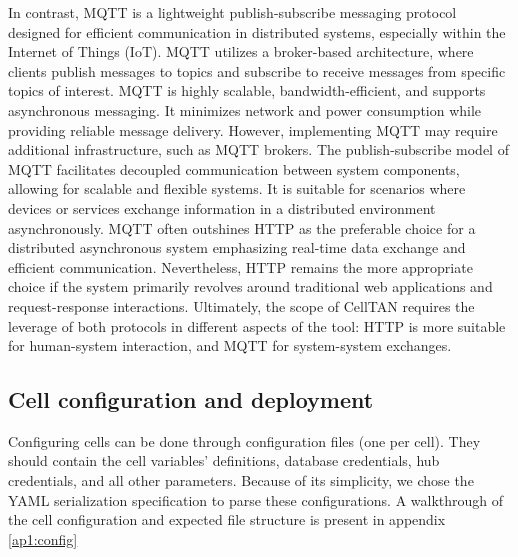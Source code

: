 In contrast, MQTT is a lightweight publish-subscribe messaging protocol designed for efficient communication in distributed systems, especially within the Internet of Things (IoT). MQTT utilizes a broker-based architecture, where clients publish messages to topics and subscribe to receive messages from specific topics of interest. MQTT is highly scalable, bandwidth-efficient, and supports asynchronous messaging. It minimizes network and power consumption while providing reliable message delivery. However, implementing MQTT may require additional infrastructure, such as MQTT brokers.
The publish-subscribe model of MQTT facilitates decoupled communication between system components, allowing for scalable and flexible systems. It is suitable for scenarios where devices or services exchange information in a distributed environment asynchronously. MQTT often outshines HTTP as the preferable choice for a distributed asynchronous system emphasizing real-time data exchange and efficient communication. Nevertheless, HTTP remains the more appropriate choice if the system primarily revolves around traditional web applications and request-response interactions. Ultimately, the scope of CellTAN requires the leverage of both protocols in different aspects of the tool: HTTP is more suitable for human-system interaction, and MQTT for system-system exchanges.


\subsection{Cell configuration and deployment}

Configuring cells can be done through configuration files (one per cell). They should contain the cell variables' definitions, database credentials, hub credentials, and all other parameters. Because of its simplicity, we chose the YAML serialization specification \cite{yaml} to parse these configurations. A walkthrough of the cell configuration and expected file structure is present in appendix \ref{ap1:config}


